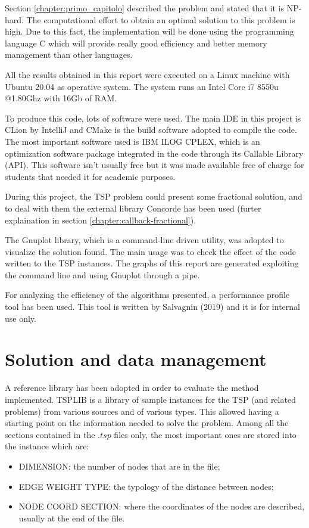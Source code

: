 Section \ref{chapter:primo_capitolo} described the problem and stated that it is NP-hard. The computational effort to obtain an optimal solution to this problem is high. Due to this fact, the implementation will be done using the programming language C which will provide really good efficiency and better memory management than other languages.

All the results obtained in this report were executed on a Linux machine with Ubuntu 20.04 as operative system. The system runs an Intel Core i7 8550u @1.80Ghz with 16Gb of RAM.

To produce this code, lots of software were used. The main IDE in this project is CLion by IntelliJ and CMake is the build software adopted to compile the code. The most important software used is IBM ILOG CPLEX, which is an optimization software package integrated in the code through its Callable Library (API). This software isn’t usually free but it was made available free of charge for students that needed it for academic purposes.

During this project, the TSP problem could present some fractional solution, and to deal with them the external library Concorde has been used (furter explaination in section \ref{chapter:callback-fractional}).

The Gnuplot library, which is a command-line driven utility, was adopted to visualize the solution found. The main usage was to check the effect of the code written to the TSP instances. The graphs of this report are generated exploiting the command line and using Gnuplot through a pipe.

For analyzing the efficiency of the algorithms presented, a performance profile tool has been used. This tool is written by Salvagnin (2019) and it is for internal use only.

\section{Solution and data management}
\label{sec:solution-data-management}
A reference library has been adopted in order to evaluate the method implemented. TSPLIB \cite{tsp-lib} is a library of sample instances for the TSP (and related problems) from various sources and of various types. This allowed having a starting point on the information needed to solve the problem. Among all the sections contained in the $.tsp$ files only, the most important ones are stored into the instance which are:
\begin{itemize}
	\item DIMENSION: the number of nodes that are in the file;
	\item EDGE WEIGHT TYPE: the typology of the distance between nodes;
	\item NODE COORD SECTION: where the coordinates of the nodes are described, usually at the end of the file.
\end{itemize}


